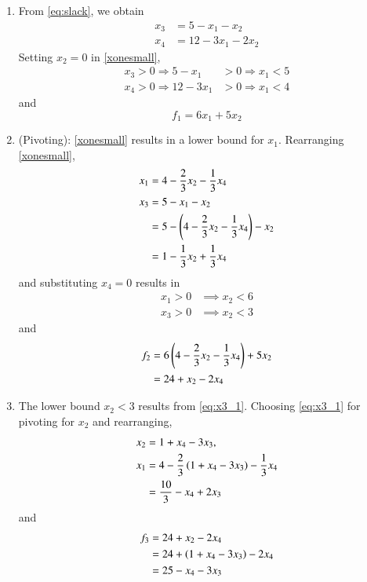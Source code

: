 \documentclass[journal,12pt,twocolumn]{IEEEtran}
\begin{document}
\begin{enumerate}[1.]
\item 
From \eqref{eq:slack}, we obtain
\begin{align}
\label{eq:x3}
x_3 &= 5 - x_1 - x_2\\
x_4 &= 12 - 3x_1 - 2x_2 
\label{xonesmall} 
\end{align}
Setting $x_2 = 0$ in \eqref{xonesmall},
\begin{align}
x_3 > 0 \Rightarrow 5-x_1 &> 0 \Rightarrow x_1 < 5  \nonumber\\
x_4 > 0 \Rightarrow 12-3x_1 &> 0 \Rightarrow x_1 < 4 
\end{align}
and
\begin{equation}
f_1 = 6x_1 + 5x_2 
\end{equation}
\item (Pivoting):
\eqref{xonesmall} results in a lower bound for $x_1$. Rearranging \eqref{xonesmall},
\begin{align}
x_1 &= 4 - \frac{2}{3}x_2 - \frac{1}{3}x_4\\
x_3 &= 5 - x_1 - x_2 \nonumber\\
&= 5 - \left(4 - \frac{2}{3}x_2 - \frac{1}{3}x_4\right) - x_2 \nonumber\\
 &= 1 - \frac{1}{3}x_2 + \frac{1}{3}x_4
 \label{eq:x3_1}
 \end{align}
and substituting $x_4 = 0$ results in
 \begin{align}
x_1 > 0 &\implies x_2 < 6 \\
x_3 > 0 &\implies x_2 < 3 
\end{align}
and
\begin{align}
f_2 &= 6\left(4 - \frac{2}{3}x_2 - \frac{1}{3}x_4\right) + 5x_2\\
&= 24 + x_2 - 2x_4
\end{align}

\item The lower bound  $x_2 < 3$ results from \eqref{eq:x3_1}.  
Choosing \eqref{eq:x3_1} for pivoting for $x_2$ and rearranging,
%
\begin{align}
x_2 &= 1 + x_4 - 3x_3,
\\
x_1 &= 4 - \frac{2}{3}\left(1 + x_4 - 3x_3\right) - \frac{1}{3}x_4\\
&= \frac{10}{3} - x_4 +2x_3
\end{align}
%
and
\begin{align}
f_3 &= 24 + x_2 - 2x_4
\\
&= 24 + \left(1 + x_4 - 3x_3\right) - 2x_4
\\
&= 25 - x_4 - 3x_3
\end{align}
\end{enumerate}
\end{document}
